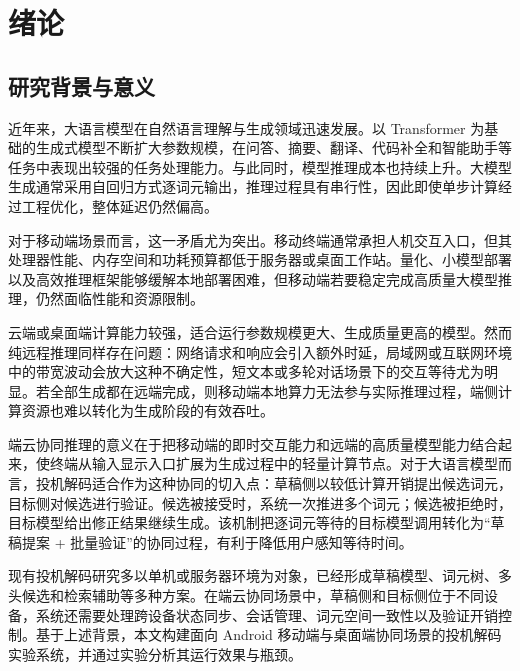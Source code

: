 \section{绪论}

\subsection{研究背景与意义}

近年来，大语言模型在自然语言理解与生成领域迅速发展。以 Transformer 为基础的生成式模型不断扩大参数规模，在问答、摘要、翻译、代码补全和智能助手等任务中表现出较强的任务处理能力\cite{vaswani2017attention,touvron2023llama2}。与此同时，模型推理成本也持续上升。大模型生成通常采用自回归方式逐词元输出，推理过程具有串行性，因此即使单步计算经过工程优化，整体延迟仍然偏高\cite{leviathan2023speculative,kwon2023pagedattention}。

对于移动端场景而言，这一矛盾尤为突出。移动终端通常承担人机交互入口，但其处理器性能、内存空间和功耗预算都低于服务器或桌面工作站。量化、小模型部署以及高效推理框架能够缓解本地部署困难\cite{ggerganov2025llamacpp,frantar2022gptq,alizadeh2023llmflash}，但移动端若要稳定完成高质量大模型推理，仍然面临性能和资源限制。

云端或桌面端计算能力较强，适合运行参数规模更大、生成质量更高的模型。然而纯远程推理同样存在问题：网络请求和响应会引入额外时延，局域网或互联网环境中的带宽波动会放大这种不确定性，短文本或多轮对话场景下的交互等待尤为明显。若全部生成都在远端完成，则移动端本地算力无法参与实际推理过程，端侧计算资源也难以转化为生成阶段的有效吞吐。

端云协同推理的意义在于把移动端的即时交互能力和远端的高质量模型能力结合起来，使终端从输入显示入口扩展为生成过程中的轻量计算节点。对于大语言模型而言，投机解码适合作为这种协同的切入点\cite{leviathan2023speculative,chen2023speculative,miao2023specinfer,li2024eagle}：草稿侧以较低计算开销提出候选词元，目标侧对候选进行验证。候选被接受时，系统一次推进多个词元；候选被拒绝时，目标模型给出修正结果继续生成。该机制把逐词元等待的目标模型调用转化为“草稿提案 + 批量验证”的协同过程，有利于降低用户感知等待时间。

现有投机解码研究多以单机或服务器环境为对象，已经形成草稿模型、词元树、多头候选和检索辅助等多种方案\cite{leviathan2023speculative,miao2023specinfer,cai2024medusa,he2023rest}。在端云协同场景中，草稿侧和目标侧位于不同设备，系统还需要处理跨设备状态同步、会话管理、词元空间一致性以及验证开销控制。基于上述背景，本文构建面向 Android 移动端与桌面端协同场景的投机解码实验系统，并通过实验分析其运行效果与瓶颈。

